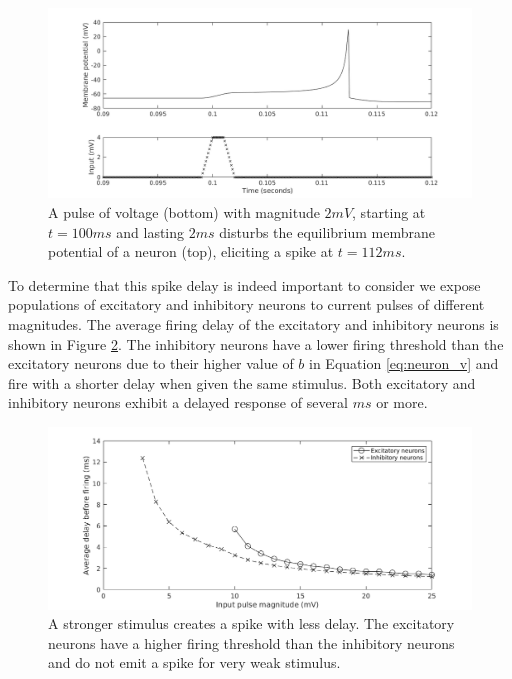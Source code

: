 \begin{figure}[!htb]
 \centering
   \includegraphics[width=\textwidth]{fig/WaveSpeed_NeuronStepTest}
   \caption{ A pulse of voltage (bottom) with magnitude $2 mV$, starting at $t=100 ms$ and lasting $2 ms$ disturbs the equilibrium membrane potential of a neuron (top), eliciting a spike at $t=112 ms$. }
   \label{fig:delay_neuronstep}
\end{figure}

To determine  that this spike delay is indeed important to consider  we expose populations of excitatory and inhibitory neurons to current pulses of different magnitudes.
The average firing delay of the excitatory and inhibitory neurons is shown in Figure \ref{fig:delay_neurondynamics}.
The inhibitory neurons have a lower firing threshold than the excitatory neurons due to their higher value of $b$ in Equation \ref{eq:neuron_v}  \citet{izhikevich2003} and fire with a shorter delay when given the same stimulus.
Both excitatory and inhibitory neurons exhibit a delayed response of several $ms$ or more.
\begin{figure}[!htb]
 \centering
   \includegraphics[width=\textwidth]{fig/WaveSpeed_NeuronDynamics}
   \caption{ A stronger stimulus creates a spike with less delay. The excitatory neurons have a higher firing threshold than the inhibitory neurons and do not emit a spike for very weak stimulus.}
   \label{fig:delay_neurondynamics}
\end{figure}

